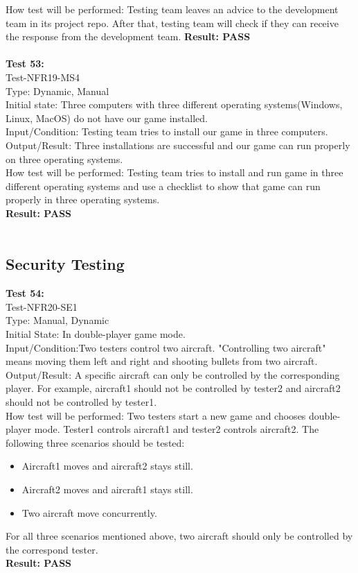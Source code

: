 \documentclass[12pt, titlepage]{article}
\begin{document}
How test will be performed: Testing team leaves an
advice to the development team in its project repo. After that, testing team will check if they
can receive the response from the development 
team.
\textbf{Result: PASS}\\\\
\textbf{Test 53:}\\
Test-NFR19-MS4\\
Type: Dynamic, Manual\\
Initial state: Three computers with three 
different operating systems(Windows, Linux, MacOS) do not have our 
game installed.\\
Input/Condition: Testing team tries to install 
our game in three computers.\\
Output/Result: Three installations are successful and our game can run properly on three operating
systems.\\
How test will be performed: Testing team tries to
install and run game in three different operating
systems and use a checklist to show that game can
run properly in three operating systems.\\
\textbf{Result: PASS}\\\\
\subsection{Security Testing}
\textbf{Test 54:}\\
Test-NFR20-SE1\\
Type: Manual, Dynamic\\
Initial State: In double-player game mode.\\
Input/Condition:Two testers control two aircraft. "Controlling two aircraft" means moving them left and right and shooting bullets 
from two aircraft.\\
Output/Result: A specific aircraft can only 
be controlled by the corresponding player. For example, aircraft1 should not be controlled by 
tester2 and aircraft2 should not be controlled by 
tester1.\\
How test will be performed: Two testers start a 
new game and chooses double-player mode. Tester1 
controls aircraft1 and tester2 controls aircraft2. The following three scenarios should
be tested:
\begin{itemize}
\item Aircraft1 moves and aircraft2 stays still.
\item Aircraft2 moves and aircraft1 stays still.
\item Two aircraft move concurrently.
\end{itemize}
For all three scenarios mentioned above, two 
aircraft should only be controlled by the 
correspond tester.\\
\textbf{Result: PASS}\\\\
\end{document}
